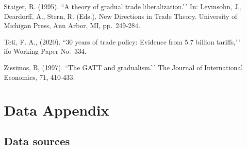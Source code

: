 \documentclass[
  12pt,
]{article}
\begin{document}
Staiger, R. (1995). ``A theory of gradual trade liberalization.'\,' In: Levinsohn, J., Deardorff, A., Stern, R. (Eds.), New Directions in Trade Theory. University of Michigan Press, Ann Arbor, MI, pp.~249-284.

Teti, F. A., (2020). ``30 years of trade policy: Evidence from 5.7 billion tariffs,'\,' ifo Working Paper No.~334.

Zissimos, B, (1997). ``The GATT and gradualism.'\,' The Journal of International Economics, 71, 410-433.

\newpage

\hypertarget{dataappendix}{%
\section{Data Appendix}\label{dataappendix}}

\hypertarget{sources}{%
\subsection{Data sources}\label{sources}}
\end{document}
